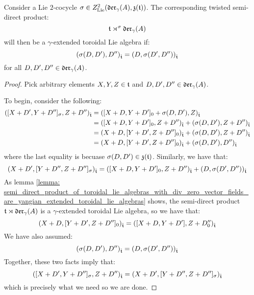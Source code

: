         \begin{proposition} \label{proposition: twisted_semi_direct_products_are_yangian_extended_toroidal_lie_algebras}
            Consider a Lie $2$-cocycle $\sigma \in Z^2_{\mathrm{Lie}}(\mathfrak{der}_{\gamma}(A), \mathfrak{z}(\mathfrak{t}))$. The corresponding twisted semi-direct product:
                $$\mathfrak{t} \rtimes^{\sigma} \mathfrak{der}_{\gamma}(A)$$
            will then be a $\gamma$-extended toroidal Lie algebra if:
                $$(\sigma(D, D'), D'')_{\hat{\mathfrak{t}}} = (D, \sigma(D', D''))_{\hat{\mathfrak{t}}}$$
            for all $D, D', D'' \in \mathfrak{der}_{\gamma}(A)$.
        \end{proposition}
            \begin{proof}
                Pick arbitrary elements $X, Y, Z \in \mathfrak{t}$ and $D, D', D'' \in \mathfrak{der}_{\gamma}(A)$.
                
                To begin, consider the following:
                    $$
                        \begin{aligned}
                            ([X + D', Y + D'']_{\sigma}, Z + D'')_{\hat{\mathfrak{t}}} & = ([X + D, Y + D']_0 + \sigma(D, D'), Z)_{\hat{\mathfrak{t}}}
                            \\
                            & = ([X + D, Y + D']_0, Z + D'')_{\hat{\mathfrak{t}}} + (\sigma(D, D'), Z + D'')_{\hat{\mathfrak{t}}}
                            \\
                            & = (X + D, [Y + D', Z + D'']_0)_{\hat{\mathfrak{t}}} + (\sigma(D, D'), Z + D'')_{\hat{\mathfrak{t}}}
                            \\
                            & = (X + D, [Y + D', Z + D'']_0)_{\hat{\mathfrak{t}}} + (\sigma(D, D'), D'')_{\hat{\mathfrak{t}}}
                        \end{aligned}
                    $$
                where the last equality is becuase $\sigma(D, D') \in \mathfrak{z}(\mathfrak{t})$. Similarly, we have that:
                    $$(X + D', [Y + D'', Z + D'']_{\sigma})_{\hat{\mathfrak{t}}} = ([X + D, Y + D']_0, Z + D'')_{\hat{\mathfrak{t}}} + (D, \sigma(D', D''))_{\hat{\mathfrak{t}}}$$
                As lemma \ref{lemma: semi_direct_product_of_toroidal_lie_algebras_with_div_zero_vector_fields_are_yangian_extended_toroidal_lie_algebras} shows, the semi-direct product $\mathfrak{t} \rtimes \mathfrak{der}_{\gamma}(A)$ is a $\gamma$-extended toroidal Lie algebra, so we have that:
                    $$(X + D, [Y + D', Z + D'']_0)_{\hat{\mathfrak{t}}} = ([X + D, Y + D'], Z + D''_0)_{\hat{\mathfrak{t}}}$$
                We have also assumed:
                    $$(\sigma(D, D'), D'')_{\hat{\mathfrak{t}}} = (D, \sigma(D', D''))_{\hat{\mathfrak{t}}}$$
                Together, these two facts imply that:
                    $$([X + D', Y + D'']_{\sigma}, Z + D'')_{\hat{\mathfrak{t}}} = (X + D', [Y + D'', Z + D'']_{\sigma})_{\hat{\mathfrak{t}}}$$
                which is precisely what we need so we are done.
            \end{proof}

